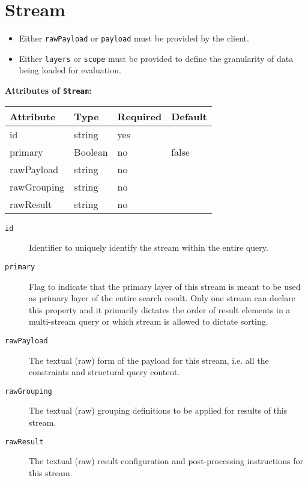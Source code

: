 \documentclass[11pt,a4paper]{report}
\newcommand{\iqlType}[1]{\texttt{\iqlns#1}}
\newenvironment{attributes}[1]{
	\noindent\textbf{Attributes of #1:}\newline\medskip
	\begin{tabular}{|p{0.3\textwidth}|p{0.20\textwidth}|p{0.20\textwidth}|p{0.17\textwidth}|}
		\hline
		\textbf{Attribute} & \textbf{Type} & \textbf{Required} & \textbf{Default} \\ 
		\hline
		\hline
	}{
	\end{tabular}
}
\newcommand{\attribute}[4]{
	#1 & #2 & #3 & #4 \\
	\hline
}
\begin{document}
\section{Stream}
\label{sec:json-ld-stream}
\vspace{-\medskipamount}
\begin{itemize}[leftmargin=*,topsep=0pt]\compresslist
	\item Either \iqlType{rawPayload} or \iqlType{payload} must be provided by the client.
	\item Either \iqlType{layers} or \iqlType{scope} must be provided to define the granularity of data being loaded for evaluation.
\end{itemize}
\begin{attributes}{\iqlType{Stream}}
	\attribute{id}{string}{yes}{}
	\attribute{primary}{Boolean}{no}{false}
	\attribute{rawPayload}{string}{no}{}
	\attribute{rawGrouping}{string}{no}{}
	\attribute{rawResult}{string}{no}{}
\end{attributes}
\begin{description}
	\item[\iqlType{id}] Identifier to uniquely identify the stream within the entire query.
	\item[\iqlType{primary}] Flag to indicate that the primary layer of this stream is meant to be used as primary layer of the entire search result. Only one stream can declare this property and it primarily dictates the order of result elements in a multi-stream query or which stream is allowed to dictate sorting.
	\item[\iqlType{rawPayload}] The textual (raw) form of the payload for this stream, i.e. all the constraints and structural query content.
	\item[\iqlType{rawGrouping}] The textual (raw) grouping definitions to be applied for results of this stream.
	\item[\iqlType{rawResult}] The textual (raw) result configuration and post-processing instructions for this stream.
\end{description}
\end{document}

